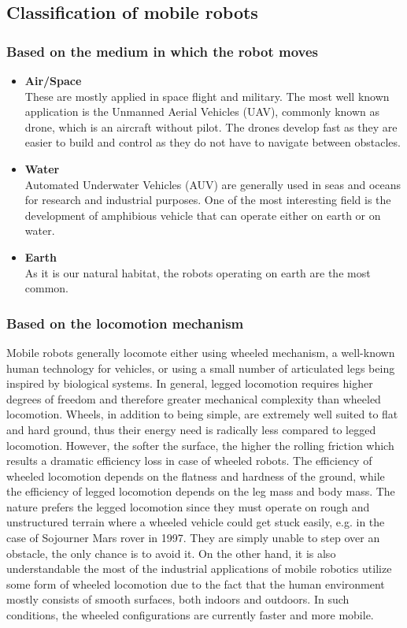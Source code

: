 \documentclass[12pt,english]{article}
\begin{document}
\subsection{Classification of mobile robots}
\subsubsection{Based on the medium in which the robot moves}
\begin{itemize}
	\item \textbf{Air/Space} \\
		These are mostly applied in space flight and military. The most well known application is the Unmanned Aerial Vehicles (UAV), commonly known as drone, which is an aircraft without pilot. The drones develop fast as they are easier to build and control as they do not have to navigate between obstacles.
	\item \textbf{Water} \\
		Automated Underwater Vehicles (AUV) are generally used in seas and oceans for research and industrial purposes. One of the most interesting field is the development of amphibious vehicle that can operate either on earth or on water.
	\item \textbf{Earth} \\
		As it is our natural habitat, the robots operating on earth are the most common.	
\end{itemize}
\subsubsection{Based on the locomotion mechanism}
Mobile robots generally locomote either using wheeled mechanism, a well-known human technology for vehicles, or using a small number of articulated legs being inspired by biological systems. In general, legged locomotion requires higher degrees of freedom and therefore greater mechanical complexity than wheeled locomotion. Wheels, in addition to being simple, are extremely well suited to flat and hard ground, thus their energy need is radically less compared to legged locomotion. However, the softer the surface, the higher the rolling friction which results a dramatic efficiency loss in case of wheeled robots. The efficiency of wheeled locomotion depends on the flatness and hardness of the ground, while the efficiency of legged locomotion depends on the leg mass and body mass. The nature prefers the legged locomotion since they must operate on rough and unstructured terrain where a wheeled vehicle could get stuck easily, e.g. in the case of Sojourner Mars rover in 1997. They are simply unable to step over an obstacle, the only chance is to avoid it.
On the other hand, it is also understandable the most of the industrial applications of mobile robotics utilize some form of wheeled locomotion due to the fact that the human environment mostly consists of smooth surfaces, both indoors and outdoors. In such conditions, the wheeled configurations are currently faster and more mobile.
\end{document}
